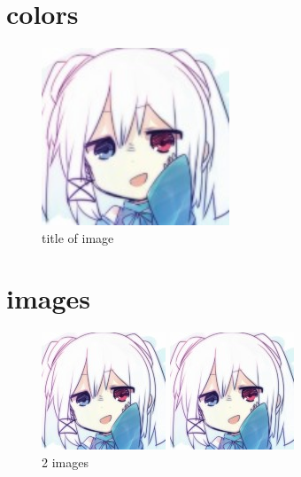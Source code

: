 \documentclass[11pt,a4paper]{article}
\begin{document}
\section{colors}{
  \begin{figure}[!h]
    \centering
    \begin{turn}{45}
      \includegraphics[width=0.5\textwidth,bb=0 0 140 132]{head_image.jpg}
    \end{turn}
    \caption{\color{tianyi_blue} title of image}
  \end{figure}
}
\clearpage

\section{images}{
  \begin{figure}[h!]
    \begin{minipage}[b]{0.45\linewidth}
      \centering
      \includegraphics[natwidth=\linewidth,natheight=0.5\linewidth,scale=1]{head_image.jpg}
    \end{minipage}
    \begin{minipage}[b]{0.45\linewidth}
      \centering
      \includegraphics[natwidth=\linewidth,natheight=0.5\linewidth,scale=1]{head_image.jpg}
    \end{minipage}
    \label{fig:2img}
    \caption{2 images}
  \end{figure}
}
\end{document}
